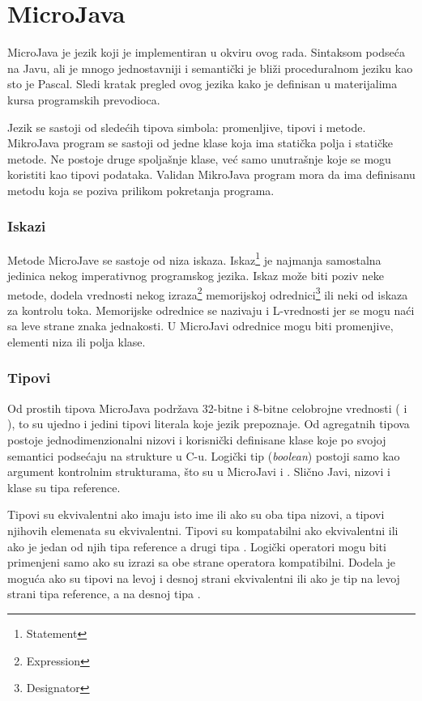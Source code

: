
\chapter{MicroJava}

MicroJava je jezik koji je implementiran u okviru ovog rada. Sintaksom podseća na Javu, ali je mnogo jednostavniji i semantički je bliži proceduralnom jeziku kao sto je Pascal. Sledi kratak pregled ovog jezika kako je definisan u materijalima kursa programskih prevodioca.

Jezik se sastoji od sledećih tipova simbola: promenljive, tipovi i metode. MikroJava program se sastoji od jedne klase koja ima statička polja i statičke metode. Ne postoje druge spoljašnje klase, već samo unutrašnje koje se mogu koristiti kao tipovi podataka. Validan  MikroJava program mora da ima definisanu metodu  koja se poziva prilikom pokretanja programa.

\subsection*{Iskazi}

Metode MicroJave se sastoje od niza iskaza. Iskaz\footnote{\eng Statement} je najmanja samostalna jedinica nekog imperativnog programskog jezika. Iskaz može biti poziv neke metode, dodela vrednosti nekog izraza\footnote{\eng Expression} memorijskoj odrednici\footnote{\eng Designator} ili neki od iskaza za kontrolu toka. Memorijske odrednice se nazivaju i L-vrednosti jer se mogu naći sa leve strane znaka jednakosti. U MicroJavi odrednice mogu biti promenjive, elementi niza ili polja klase.

\subsection*{Tipovi}

Od prostih tipova MicroJava podržava 32-bitne i 8-bitne celobrojne vrednosti ( i ), to su ujedno i jedini tipovi literala koje jezik prepoznaje. Od agregatnih tipova postoje jednodimenzionalni nizovi i korisnički definisane  klase koje po svojoj semantici podsećaju na strukture u C-u. Logički tip (\textit{boolean}) postoji samo kao argument kontrolnim strukturama, što su u MicroJavi  i . Slično Javi, nizovi i klase su tipa reference.

Tipovi su ekvivalentni ako imaju isto ime ili ako su oba tipa nizovi, a tipovi njihovih elemenata su ekvivalentni. Tipovi su kompatabilni ako ekvivalentni ili ako je jedan od njih tipa reference a drugi tipa . Logički operatori mogu biti primenjeni samo ako su izrazi sa obe strane operatora kompatibilni. Dodela je moguća ako su tipovi na levoj i desnoj strani ekvivalentni ili ako je tip na levoj strani tipa reference, a na desnoj tipa .

